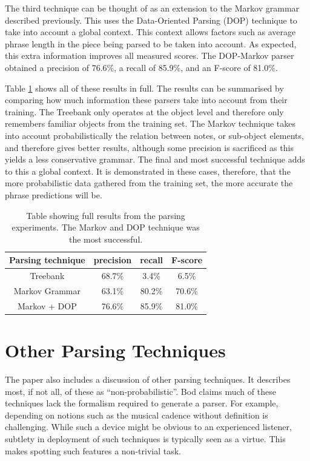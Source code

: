 \documentclass[a4paper,12pt]{article}
\begin{document}
The third technique can be thought of as an extension to the Markov grammar described previously. This uses the Data-Oriented Parsing (DOP) technique to take into account a global context. This context allows factors such as average phrase length in the piece being parsed to be taken into account. As expected, this extra information improves all measured scores. The DOP-Markov parser obtained a precision of 76.6\%, a recall of 85.9\%, and an F-score of 81.0\%. 

Table \ref{resulttab} shows all of these results in full. The results can be summarised by comparing how much information these parsers take into account from their training. The Treebank only operates at the object level and therefore only remembers familiar objects from the training set. The Markov technique takes into account probabilistically the relation between notes, or sub-object elements, and therefore gives better results, although some precision is sacrificed as this yields a less conservative grammar. The final and most successful technique adds to this a global context. It is demonstrated in these cases, therefore, that the more probabilistic data gathered from the training set, the more accurate the phrase predictions will be.

\begin{table}
\centering
\begin{tabular}{ |c|c|c|c| } 
 \hline
 Parsing technique & precision & recall & F-score \\ 
 \hline
 Treebank & 68.7\% & 3.4\% & 6.5\% \\ 
 Markov Grammar & 63.1\% & 80.2\% & 70.6\% \\ 
 Markov + DOP & 76.6\% & 85.9\% & 81.0\% \\ 

 \hline
\end{tabular}
\caption{Table showing full results from the parsing experiments. The Markov and DOP technique was the most successful.}
\label{resulttab}
\end{table}

\section{Other Parsing Techniques}

The paper \cite{Bod_probabilisticgrammars} also includes a discussion of other parsing techniques. It describes most, if not all, of these as ``non-probabilistic''. Bod claims much of these techniques lack the formalism required to generate a parser. For example, depending on notions such as the musical cadence without definition is challenging. While such a device might be obvious to an experienced listener, subtlety in deployment of such techniques is typically seen as a virtue. This makes spotting such features a non-trivial task.
\end{document}
